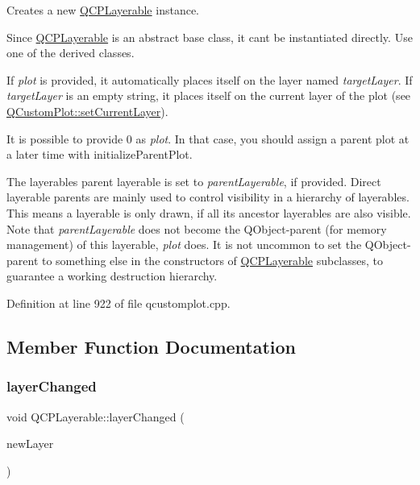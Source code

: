 Creates a new \hyperlink{class_q_c_p_layerable}{Q\+C\+P\+Layerable} instance.

Since \hyperlink{class_q_c_p_layerable}{Q\+C\+P\+Layerable} is an abstract base class, it can\textquotesingle{}t be instantiated directly. Use one of the derived classes.

If {\itshape plot} is provided, it automatically places itself on the layer named {\itshape target\+Layer}. If {\itshape target\+Layer} is an empty string, it places itself on the current layer of the plot (see \hyperlink{class_q_custom_plot_a73a6dc47c653bb6f8f030abca5a11852}{Q\+Custom\+Plot\+::set\+Current\+Layer}).

It is possible to provide 0 as {\itshape plot}. In that case, you should assign a parent plot at a later time with initialize\+Parent\+Plot.

The layerable\textquotesingle{}s parent layerable is set to {\itshape parent\+Layerable}, if provided. Direct layerable parents are mainly used to control visibility in a hierarchy of layerables. This means a layerable is only drawn, if all its ancestor layerables are also visible. Note that {\itshape parent\+Layerable} does not become the Q\+Object-\/parent (for memory management) of this layerable, {\itshape plot} does. It is not uncommon to set the Q\+Object-\/parent to something else in the constructors of \hyperlink{class_q_c_p_layerable}{Q\+C\+P\+Layerable} subclasses, to guarantee a working destruction hierarchy. 

Definition at line 922 of file qcustomplot.\+cpp.



\subsection{Member Function Documentation}
\mbox{\label{class_q_c_p_layerable_abbf8657cedea73ac1c3499b521c90eba}} 
\subsubsection{\texorpdfstring{layer\+Changed}{layerChanged}}
{\footnotesize\ttfamily void Q\+C\+P\+Layerable\+::layer\+Changed (\begin{DoxyParamCaption}\item[{\hyperlink{class_q_c_p_layer}{Q\+C\+P\+Layer} $\ast$}]{new\+Layer }\end{DoxyParamCaption})\hspace{0.3cm}{\ttfamily [signal]}}

